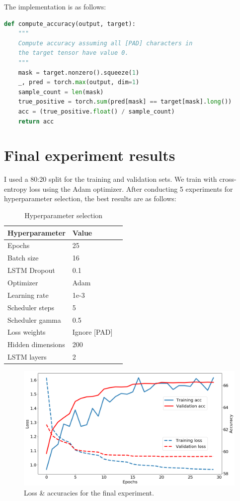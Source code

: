 \documentclass[twocolumn, 9pt]{article}
\begin{document}
The implementation is as follows:
\begin{lstlisting}[language=Python]
def compute_accuracy(output, target):
    """
    Compute accuracy assuming all [PAD] characters in
    the target tensor have value 0.
    """
    mask = target.nonzero().squeeze(1)
    _, pred = torch.max(output, dim=1)
    sample_count = len(mask)
    true_positive = torch.sum(pred[mask] == target[mask].long())
    acc = (true_positive.float() / sample_count)
    return acc
\end{lstlisting}

\section{Final experiment results}
I used a 80:20 split for the training and validation sets. We train with cross-entropy
loss using the Adam optimizer. After conducting 5 experiments for hyperparameter selection,
the best results are as follows:

\begin{table}[h]
  \centering
  \begin{tabular}{lll}
    \toprule
    Hyperparameter    & Value  \\
    \midrule
    Epochs            & 25     \\
    Batch size        & 16     \\
    LSTM Dropout      & 0.1    \\
    Optimizer         & Adam   \\
    Learning rate     & 1e-3   \\
    Scheduler steps   & 5      \\
    Scheduler gamma   & 0.5    \\
    Loss weights      & Ignore [PAD]\\
    Hidden dimensions & 200 \\
    LSTM layers       & 2   \\
    \bottomrule
  \end{tabular}
  \caption{Hyperparameter selection}
  \label{tab:hyp1}
\end{table}



\begin{figure}[htbp]
	\centering
	\includegraphics[width=0.95\columnwidth]{exp1.png}
	\caption{Loss \& accuracies for the final experiment.}
	\label{fig:exp1}
\end{figure}
\end{document}
